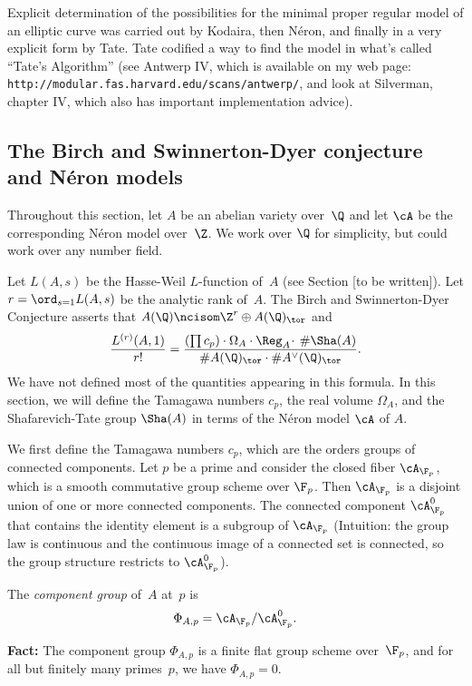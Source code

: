 \documentclass{report}
\begin{document}
Explicit determination of the possibilities for the minimal proper
regular model of an elliptic curve was carried out by Kodaira,
then N\'eron, and finally in a very explicit form by Tate.  Tate
codified a way to find the model in what's called ``Tate's
Algorithm'' (see Antwerp IV, which is available on my web page:
{\tt http://modular.fas.harvard.edu/scans/antwerp/}, and look at
Silverman, chapter IV, which also has important implementation
advice).


\subsection{The Birch and Swinnerton-Dyer conjecture and N\'eron models}
Throughout this section, let $A$ be an abelian variety over~$\Q$
and let $\cA$ be the corresponding N\'eron model over~$\Z$.  We
work over $\Q$ for simplicity, but could work over any number
field.

Let $L(A,s)$ be the Hasse-Weil $L$-function of~$A$ (see Section
[to be written]). Let $r=\ord_{s=1} L(A,s)$
be the analytic rank of~$A$.  The Birch and Swinnerton-Dyer
Conjecture asserts that $A(\Q)\ncisom \Z^r\oplus A(\Q)_{\tor}$ and
\[
  \frac{L^{(r)}(A,1)}{r!} = \frac{\left(\prod c_p\right)\cdot
  \Omega_A\cdot \Reg_A\!\cdot\, \#\Sha(A)}{\#A(\Q)_{\tor}\cdot
  \#A^{\vee}(\Q)_{\tor}}.
\]
We have not defined most of the quantities appearing in this
formula.  In this section, we will define the Tamagawa numbers
$c_p$, the real volume $\Omega_A$, and the Shafarevich-Tate group
$\Sha(A)$ in terms of the N\'eron model $\cA$ of $A$.

We first define the Tamagawa numbers $c_p$, which are the orders
groups of connected components.  Let $p$ be a prime and consider
the closed fiber $\cA_{\F_p}$, which is a smooth commutative group
scheme over $\F_p$.  Then $\cA_{\F_p}$ is a disjoint union of one
or more connected components.  The connected component
$\cA_{\F_p}^0$ that contains the identity element is a subgroup of
$\cA_{\F_p}$ (Intuition: the group law is continuous and the
continuous image of a connected set is connected, so the group
structure restricts to $\cA_{\F_p}^0$).

\begin{definition}
The {\em component group} of~$A$ at~$p$ is
\[
\Phi_{A,p} = \cA_{\F_p} / \cA_{\F_p}^0.
\]
\end{definition}
{\bf Fact:} The component group $\Phi_{A,p}$ is a finite flat
group scheme over~$\F_p$, and for all but
finitely many primes~$p$, we have $\Phi_{A,p}=0$.
\end{document}
